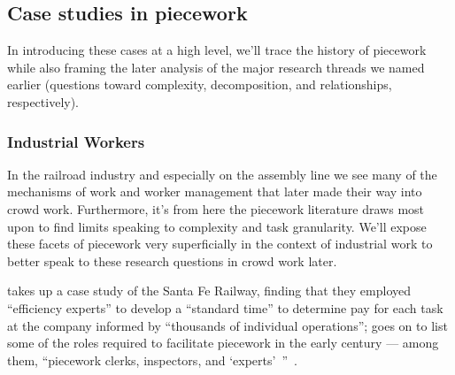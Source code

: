 \documentclass[trackingWork]{subfiles}
\begin{document}
\subsection{Case studies in piecework}
In introducing these cases at a high level,
we'll trace the history of piecework
while also framing the later analysis of the major research threads we named earlier
(questions toward complexity, decomposition, and relationships, respectively).



\begin{comment}
What did I pull from the threads that are related to industrial and railroad workers (i.e. 1920 onward?)

- Graves: railway companies used ``efficiency experts'' to study how long tasks should take
- Hart: evaluation limits complexity (we can affect that with peer evaluation!)
- Graves: sparks of Scientific Management in Piecework
- organization types are important determinants of piecework viability: lots of types of tasks? bad
  - Hart (I think?): variability in *worker* quality is fine
- Foreman is important
- Worker advocacy groups arose to speak out against piecework

\end{comment}

\subsubsection{Industrial Workers}
In the railroad industry and especially on the assembly line
we see many of the mechanisms of work and worker management that later made their way into crowd work.
Furthermore, it's from here the piecework literature draws most upon to find limits speaking to complexity and task granularity.
We'll expose these facets of piecework very superficially in the context of industrial work
to better speak to these research questions in crowd work later.

\citeauthor{10.2307/23702539} takes up a case study of the Santa Fe Railway,
finding that they employed ``efficiency experts'' to develop a ``standard time''
to determine pay for each task at the company informed by
``thousands of individual operations''; %
\citeauthor{10.2307/23702539} goes on to list
some of the roles required to facilitate piecework
in the early  century
--- among them, ``piecework clerks, inspectors, and `experts'~''~\cite{10.2307/23702539}.
\end{document}
